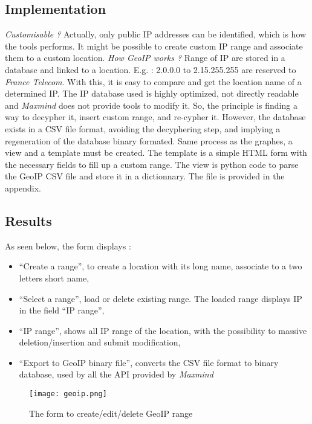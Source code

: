 \documentclass{koala-en}
\begin{document}
\subsection{Implementation}
\emph{Customisable ?}
Actually, only public IP addresses can be identified, which is how the tools performs. It might be possible to create custom IP range and associate them to a custom location.
\newline
\newline
\emph{How GeoIP works ?} Range of IP are stored in a database and linked to a location. E.g. : 2.0.0.0 to 2.15.255.255 are reserved to \emph{France Telecom}. With this, it is easy to compare and get the location name of a determined IP. The IP database used is highly optimized, not directly readable and \emph{Maxmind} does not provide tools to modify it. So, the principle is finding a way to decypher it, insert custom range, and re-cypher it. However, the database exists in a CSV file format, avoiding the decyphering step, and implying a regeneration of the database binary formated.
\newline
\newline
Same process as the graphes, a view and a template must be created. The template is a simple HTML form with the necessary fields to fill up a custom range. The view is python code to parse the GeoIP CSV file and store it in a dictionnary. The file is provided in the appendix.

\subsection{Results}
As seen below, the form displays :
\begin{itemize}
  \item ``Create a range'', to create a location with its long name, associate to a two letters short name,
  \item ``Select a range'', load or delete existing range. The loaded range displays IP in the field ``IP range'',
  \item ``IP range'', shows all IP range of the location, with the possibility to massive deletion/insertion and submit modification,
  \item ``Export to GeoIP binary file'', converts the CSV file format to binary database, used by all the API provided by \emph{Maxmind}
\end{itemize}

\begin{figure}[!ht]
  \center
  \texttt{[image: geoip.png]}
  \caption{The form to create/edit/delete GeoIP range}
\end{figure}
\end{document}
